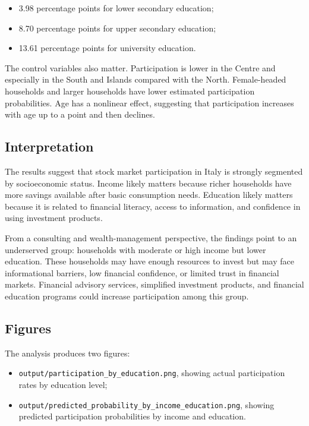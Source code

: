 \begin{itemize}
    \item 3.98 percentage points for lower secondary education;
    \item 8.70 percentage points for upper secondary education;
    \item 13.61 percentage points for university education.
\end{itemize}

The control variables also matter. Participation is lower in the Centre and especially in the South and Islands compared with the North. Female-headed households and larger households have lower estimated participation probabilities. Age has a nonlinear effect, suggesting that participation increases with age up to a point and then declines.

\subsection{Interpretation}

The results suggest that stock market participation in Italy is strongly segmented by socioeconomic status. Income likely matters because richer households have more savings available after basic consumption needs. Education likely matters because it is related to financial literacy, access to information, and confidence in using investment products.

From a consulting and wealth-management perspective, the findings point to an underserved group: households with moderate or high income but lower education. These households may have enough resources to invest but may face informational barriers, low financial confidence, or limited trust in financial markets. Financial advisory services, simplified investment products, and financial education programs could increase participation among this group.

\subsection{Figures}

The analysis produces two figures:

\begin{itemize}
    \item \texttt{output/participation\_by\_education.png}, showing actual participation rates by education level;
    \item \texttt{output/predicted\_probability\_by\_income\_education.png}, showing predicted participation probabilities by income and education.
\end{itemize}

